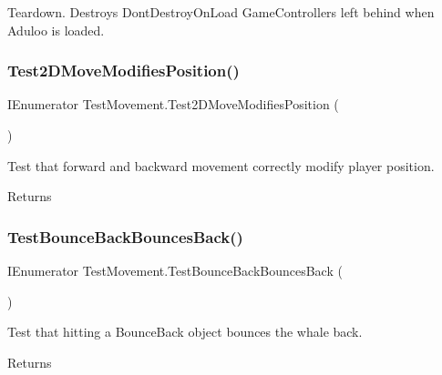Teardown. Destroys Dont\+Destroy\+On\+Load Game\+Controllers left behind when Aduloo is loaded. 

\mbox{\label{class_test_movement_ae5b9bf5e6413a93f4d1a0d3b979dd7d1}} 
\subsubsection{\texorpdfstring{Test2\+D\+Move\+Modifies\+Position()}{Test2DMoveModifiesPosition()}}
{\footnotesize\ttfamily I\+Enumerator Test\+Movement.\+Test2\+D\+Move\+Modifies\+Position (\begin{DoxyParamCaption}{ }\end{DoxyParamCaption})}



Test that forward and backward movement correctly modify player position. 

\begin{DoxyReturn}{Returns}

\end{DoxyReturn}
\mbox{\label{class_test_movement_a1de5217b6d56fba40c12f7edbbb3d071}} 
\subsubsection{\texorpdfstring{Test\+Bounce\+Back\+Bounces\+Back()}{TestBounceBackBouncesBack()}}
{\footnotesize\ttfamily I\+Enumerator Test\+Movement.\+Test\+Bounce\+Back\+Bounces\+Back (\begin{DoxyParamCaption}{ }\end{DoxyParamCaption})}



Test that hitting a Bounce\+Back object bounces the whale back. 

\begin{DoxyReturn}{Returns}

\end{DoxyReturn}
\mbox{\label{class_test_movement_ab57160ba5b445dda6736525803be376d}} 
